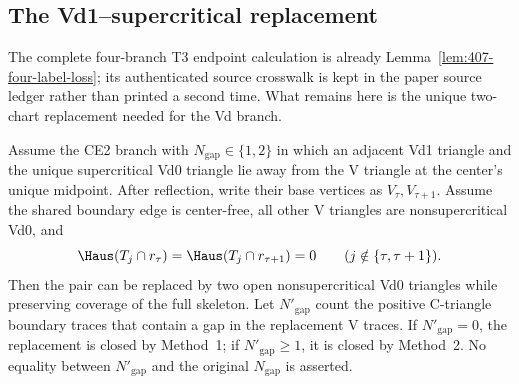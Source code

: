 \subsection{The Vd1--supercritical replacement}
\label{sec:strategy2-rigor-completion}

The complete four-branch T3 endpoint calculation is already
Lemma~\ref{lem:407-four-label-loss}; its authenticated source crosswalk is
kept in the paper source ledger rather than printed a second time.  What
remains here is the unique two-chart replacement needed for the Vd branch.

\begin{proposition}
\label{prop:paper-vd1-pair-replacement}
Assume the CE2 branch with $N_{\mathrm{gap}}\in\{1,2\}$ in which an adjacent
Vd1 triangle and the unique supercritical Vd0 triangle lie away from the V
triangle at the center's unique midpoint.  After reflection, write their base
vertices as $V_\tau,V_{\tau+1}$.
Assume the shared boundary edge is center-free, all other V triangles are
nonsupercritical Vd0, and
\[
 \Haus(T_j\cap r_\tau)=\Haus(T_j\cap r_{\tau+1})=0
 \qquad(j\notin\{\tau,\tau+1\}).
\]
Then the pair can be replaced by two open
nonsupercritical Vd0 triangles while preserving coverage of the full skeleton.
Let $N'_{\mathrm{gap}}$ count the positive C-triangle boundary traces that
contain a gap in the replacement V traces.  If $N'_{\mathrm{gap}}=0$, the
replacement is closed by Method~1; if $N'_{\mathrm{gap}}\ge1$, it is closed
by Method~2.  No equality between $N'_{\mathrm{gap}}$ and the original
$N_{\mathrm{gap}}$ is asserted.
\end{proposition}

